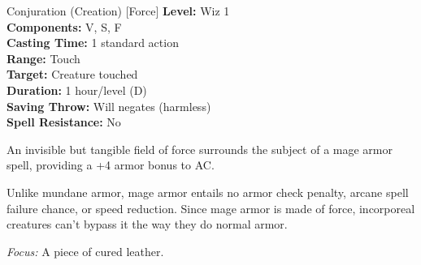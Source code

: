 {Conjuration (Creation) [Force]}
{
	\textbf{Level:}
	Wiz 1\\
	\textbf{Components:}
	V, S, F\\
	\textbf{Casting Time:}
	1 standard action\\
	\textbf{Range:}
	Touch\\
	\textbf{Target:}
	Creature touched\\
	\textbf{Duration:}
	1 hour/level (D)\\
	\textbf{Saving Throw:}
	Will negates (harmless)\\
	\textbf{Spell Resistance:}
	No\\
}
{
	An invisible but tangible field of force surrounds the subject of a mage armor spell, providing a +4 armor bonus to AC.

	Unlike mundane armor, mage armor entails no armor check penalty, arcane spell failure chance, or speed reduction. Since mage armor is made of force, incorporeal creatures can't bypass it the way they do normal armor.

	\textit{Focus:}
	A piece of cured leather.

}
